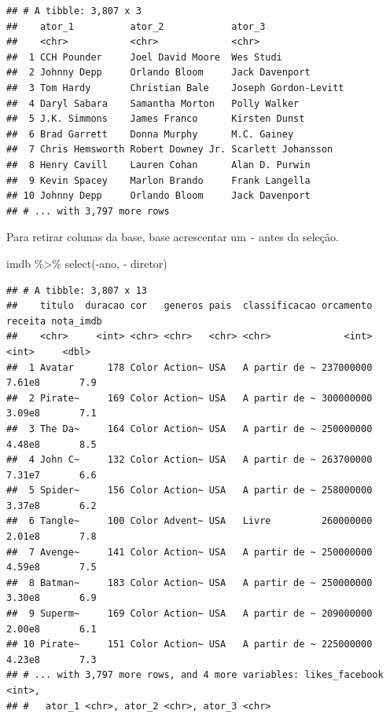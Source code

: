 \documentclass[
]{book}
\newenvironment{Shaded}{\begin{snugshade}}{\end{snugshade}}
\newcommand{\FunctionTok}[1]{\textcolor[rgb]{0.00,0.00,0.00}{#1}}
\newcommand{\NormalTok}[1]{#1}
\newcommand{\SpecialCharTok}[1]{\textcolor[rgb]{0.00,0.00,0.00}{#1}}
\begin{document}
\begin{verbatim}
## # A tibble: 3,807 x 3
##    ator_1          ator_2            ator_3              
##    <chr>           <chr>             <chr>               
##  1 CCH Pounder     Joel David Moore  Wes Studi           
##  2 Johnny Depp     Orlando Bloom     Jack Davenport      
##  3 Tom Hardy       Christian Bale    Joseph Gordon-Levitt
##  4 Daryl Sabara    Samantha Morton   Polly Walker        
##  5 J.K. Simmons    James Franco      Kirsten Dunst       
##  6 Brad Garrett    Donna Murphy      M.C. Gainey         
##  7 Chris Hemsworth Robert Downey Jr. Scarlett Johansson  
##  8 Henry Cavill    Lauren Cohan      Alan D. Purwin      
##  9 Kevin Spacey    Marlon Brando     Frank Langella      
## 10 Johnny Depp     Orlando Bloom     Jack Davenport      
## # ... with 3,797 more rows
\end{verbatim}

Para retirar colunas da base, base acrescentar um \texttt{-} antes da seleção.

\begin{Shaded}
\begin{Highlighting}[]
\NormalTok{imdb }\SpecialCharTok{\%\textgreater{}\%}
  \FunctionTok{select}\NormalTok{(}\SpecialCharTok{{-}}\NormalTok{ano, }\SpecialCharTok{{-}}\NormalTok{ diretor)}
\end{Highlighting}
\end{Shaded}

\begin{verbatim}
## # A tibble: 3,807 x 13
##    titulo  duracao cor   generos pais  classificacao orcamento receita nota_imdb
##    <chr>     <int> <chr> <chr>   <chr> <chr>             <int>   <int>     <dbl>
##  1 Avatar      178 Color Action~ USA   A partir de ~ 237000000  7.61e8       7.9
##  2 Pirate~     169 Color Action~ USA   A partir de ~ 300000000  3.09e8       7.1
##  3 The Da~     164 Color Action~ USA   A partir de ~ 250000000  4.48e8       8.5
##  4 John C~     132 Color Action~ USA   A partir de ~ 263700000  7.31e7       6.6
##  5 Spider~     156 Color Action~ USA   A partir de ~ 258000000  3.37e8       6.2
##  6 Tangle~     100 Color Advent~ USA   Livre         260000000  2.01e8       7.8
##  7 Avenge~     141 Color Action~ USA   A partir de ~ 250000000  4.59e8       7.5
##  8 Batman~     183 Color Action~ USA   A partir de ~ 250000000  3.30e8       6.9
##  9 Superm~     169 Color Action~ USA   A partir de ~ 209000000  2.00e8       6.1
## 10 Pirate~     151 Color Action~ USA   A partir de ~ 225000000  4.23e8       7.3
## # ... with 3,797 more rows, and 4 more variables: likes_facebook <int>,
## #   ator_1 <chr>, ator_2 <chr>, ator_3 <chr>
\end{verbatim}
\end{document}
